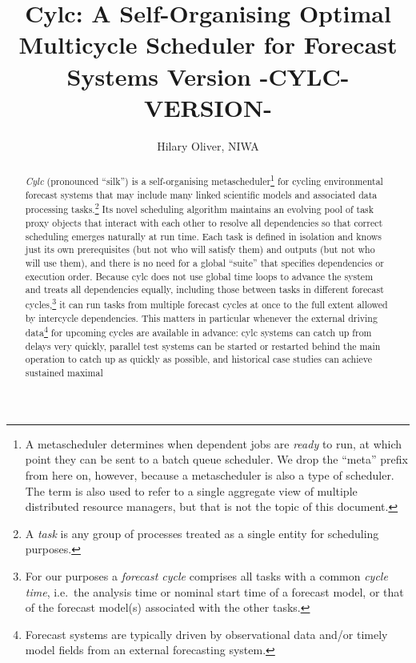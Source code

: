 \documentclass[11pt,a4paper]{article}
\title{Cylc: A Self-Organising Optimal Multicycle Scheduler for Forecast Systems \linebreak Version -CYLC-VERSION-}
\author{Hilary Oliver, NIWA}
\begin{document}
\maketitle

\pagebreak
\tableofcontents
\pagebreak

\begin{abstract}

    {\em Cylc} (pronounced ``silk'') is a self-organising
    metascheduler\footnote{A metascheduler determines when dependent
    jobs are {\em ready} to run, at which point they can be sent to a
    batch queue scheduler. We drop the ``meta'' prefix from here on,
    however, because a metascheduler is also a type of scheduler. The
    term is also used to refer to a single aggregate view of multiple
    distributed resource managers, but that is not the topic of this
    document.} for cycling environmental forecast systems that may include
    many linked scientific models and associated data processing
    tasks.\footnote{A {\em task} is any group of processes treated as a
    single entity for scheduling purposes.} Its novel scheduling
    algorithm maintains an evolving pool of task proxy objects that
    interact with each other to resolve all dependencies so that correct
    scheduling emerges naturally at run time.  Each task is defined in
    isolation and knows just its own prerequisites (but not who will
    satisfy them) and outputs (but not who will use them), and there is
    no need for a global ``suite'' that specifies dependencies or
    execution order. Because cylc does not use global time loops to
    advance the system and treats all dependencies equally, including
    those between tasks in different forecast cycles,\footnote{For our
    purposes a {\em forecast cycle} comprises all tasks with a common
    {\em cycle time}, i.e.\ the analysis time or nominal start time of a
    forecast model, or that of the forecast model(s) associated with the
    other tasks.} it can run tasks from multiple forecast cycles at once
    to the full extent allowed by intercycle dependencies. This matters
    in particular whenever the external driving data\footnote{Forecast
    systems are typically driven by observational data and/or timely
    model fields from an external forecasting system.} for upcoming
    cycles are available in advance: cylc systems can catch up from
    delays very quickly, parallel test systems can be started or
    restarted behind the main operation to catch up as quickly as
    possible, and historical case studies can achieve sustained maximal

\end{abstract}
\end{document}
